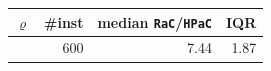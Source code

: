\begin{tabular}{@{}rrrr@{}}
\toprule
$\varrho$ & \#inst & median \texttt{RaC}/\texttt{HPaC} & IQR \\
\midrule
 & 600 & 7.44 & 1.87 \\
\bottomrule
\end{tabular}
